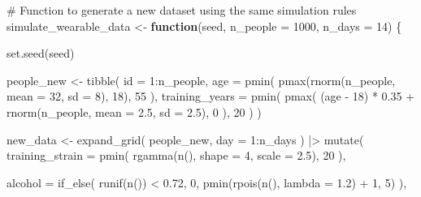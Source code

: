 \documentclass[
  letterpaper,
  DIV=11,
  numbers=noendperiod]{scrreprt}
\newenvironment{Shaded}{\begin{snugshade}}{\end{snugshade}}
\newcommand{\AttributeTok}[1]{\textcolor[rgb]{0.40,0.45,0.13}{#1}}
\newcommand{\CommentTok}[1]{\textcolor[rgb]{0.37,0.37,0.37}{#1}}
\newcommand{\ControlFlowTok}[1]{\textcolor[rgb]{0.00,0.23,0.31}{\textbf{#1}}}
\newcommand{\DecValTok}[1]{\textcolor[rgb]{0.68,0.00,0.00}{#1}}
\newcommand{\FloatTok}[1]{\textcolor[rgb]{0.68,0.00,0.00}{#1}}
\newcommand{\FunctionTok}[1]{\textcolor[rgb]{0.28,0.35,0.67}{#1}}
\newcommand{\NormalTok}[1]{\textcolor[rgb]{0.00,0.23,0.31}{#1}}
\newcommand{\OtherTok}[1]{\textcolor[rgb]{0.00,0.23,0.31}{#1}}
\newcommand{\SpecialCharTok}[1]{\textcolor[rgb]{0.37,0.37,0.37}{#1}}
\begin{document}
\begin{Shaded}
\begin{Highlighting}[]
\CommentTok{\# Function to generate a new dataset using the same simulation rules}
\NormalTok{simulate\_wearable\_data }\OtherTok{\textless{}{-}} \ControlFlowTok{function}\NormalTok{(seed, }\AttributeTok{n\_people =} \DecValTok{1000}\NormalTok{, }\AttributeTok{n\_days =} \DecValTok{14}\NormalTok{) \{}

  \FunctionTok{set.seed}\NormalTok{(seed)}

\NormalTok{  people\_new }\OtherTok{\textless{}{-}} \FunctionTok{tibble}\NormalTok{(}
    \AttributeTok{id =} \DecValTok{1}\SpecialCharTok{:}\NormalTok{n\_people,}
    \AttributeTok{age =} \FunctionTok{pmin}\NormalTok{(}
      \FunctionTok{pmax}\NormalTok{(}\FunctionTok{rnorm}\NormalTok{(n\_people, }\AttributeTok{mean =} \DecValTok{32}\NormalTok{, }\AttributeTok{sd =} \DecValTok{8}\NormalTok{), }\DecValTok{18}\NormalTok{),}
      \DecValTok{55}
\NormalTok{    ),}
    \AttributeTok{training\_years =} \FunctionTok{pmin}\NormalTok{(}
      \FunctionTok{pmax}\NormalTok{(}
\NormalTok{        (age }\SpecialCharTok{{-}} \DecValTok{18}\NormalTok{) }\SpecialCharTok{*} \FloatTok{0.35} \SpecialCharTok{+}
          \FunctionTok{rnorm}\NormalTok{(n\_people, }\AttributeTok{mean =} \FloatTok{2.5}\NormalTok{, }\AttributeTok{sd =} \FloatTok{2.5}\NormalTok{),}
        \DecValTok{0}
\NormalTok{      ),}
      \DecValTok{20}
\NormalTok{    )}
\NormalTok{  )}

\NormalTok{  new\_data }\OtherTok{\textless{}{-}} \FunctionTok{expand\_grid}\NormalTok{(}
\NormalTok{    people\_new,}
    \AttributeTok{day =} \DecValTok{1}\SpecialCharTok{:}\NormalTok{n\_days}
\NormalTok{  ) }\SpecialCharTok{|\textgreater{}}
    \FunctionTok{mutate}\NormalTok{(}
      \AttributeTok{training\_strain =} \FunctionTok{pmin}\NormalTok{(}
        \FunctionTok{rgamma}\NormalTok{(}\FunctionTok{n}\NormalTok{(), }\AttributeTok{shape =} \DecValTok{4}\NormalTok{, }\AttributeTok{scale =} \FloatTok{2.5}\NormalTok{),}
        \DecValTok{20}
\NormalTok{      ),}

      \AttributeTok{alcohol =} \FunctionTok{if\_else}\NormalTok{(}
        \FunctionTok{runif}\NormalTok{(}\FunctionTok{n}\NormalTok{()) }\SpecialCharTok{\textless{}} \FloatTok{0.72}\NormalTok{,}
        \DecValTok{0}\NormalTok{,}
        \FunctionTok{pmin}\NormalTok{(}\FunctionTok{rpois}\NormalTok{(}\FunctionTok{n}\NormalTok{(), }\AttributeTok{lambda =} \FloatTok{1.2}\NormalTok{) }\SpecialCharTok{+} \DecValTok{1}\NormalTok{, }\DecValTok{5}\NormalTok{)}
\NormalTok{      ),}


\end{Highlighting}
\end{Shaded}
\end{document}
